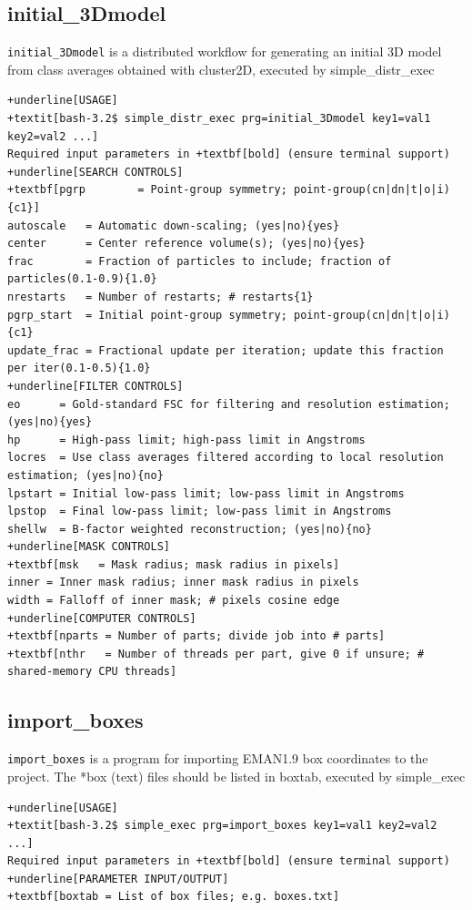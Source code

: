 \documentclass[a4paper,11pt]{article}
\newcommand{\prgname}[1]{\textcolor{NavyBlue}{\texttt{#1}}}
\begin{document}
\subsection{initial\_3Dmodel}
\label{initial_3Dmodel}
\prgname{initial\_3Dmodel} is a distributed workflow for generating an initial 3D model from class averages obtained with cluster2D, executed by simple\_distr\_exec
\begin{Verbatim}[commandchars=+\[\],fontsize=\small,breaklines=true]
+underline[USAGE]
+textit[bash-3.2$ simple_distr_exec prg=initial_3Dmodel key1=val1 key2=val2 ...]
Required input parameters in +textbf[bold] (ensure terminal support)
+underline[SEARCH CONTROLS]
+textbf[pgrp        = Point-group symmetry; point-group(cn|dn|t|o|i){c1}]
autoscale   = Automatic down-scaling; (yes|no){yes}
center      = Center reference volume(s); (yes|no){yes}
frac        = Fraction of particles to include; fraction of particles(0.1-0.9){1.0}
nrestarts   = Number of restarts; # restarts{1}
pgrp_start  = Initial point-group symmetry; point-group(cn|dn|t|o|i){c1}
update_frac = Fractional update per iteration; update this fraction per iter(0.1-0.5){1.0}
+underline[FILTER CONTROLS]
eo      = Gold-standard FSC for filtering and resolution estimation; (yes|no){yes}
hp      = High-pass limit; high-pass limit in Angstroms
locres  = Use class averages filtered according to local resolution estimation; (yes|no){no}
lpstart = Initial low-pass limit; low-pass limit in Angstroms
lpstop  = Final low-pass limit; low-pass limit in Angstroms
shellw  = B-factor weighted reconstruction; (yes|no){no}
+underline[MASK CONTROLS]
+textbf[msk   = Mask radius; mask radius in pixels]
inner = Inner mask radius; inner mask radius in pixels
width = Falloff of inner mask; # pixels cosine edge
+underline[COMPUTER CONTROLS]
+textbf[nparts = Number of parts; divide job into # parts]
+textbf[nthr   = Number of threads per part, give 0 if unsure; # shared-memory CPU threads]
\end{Verbatim}

\subsection{import\_boxes}
\label{import_boxes}
\prgname{import\_boxes} is a program for importing EMAN1.9 box coordinates to the project. The *box (text) files should be listed in boxtab, executed by simple\_exec
\begin{Verbatim}[commandchars=+\[\],fontsize=\small,breaklines=true]
+underline[USAGE]
+textit[bash-3.2$ simple_exec prg=import_boxes key1=val1 key2=val2 ...]
Required input parameters in +textbf[bold] (ensure terminal support)
+underline[PARAMETER INPUT/OUTPUT]
+textbf[boxtab = List of box files; e.g. boxes.txt]
\end{Verbatim}
\end{document}

